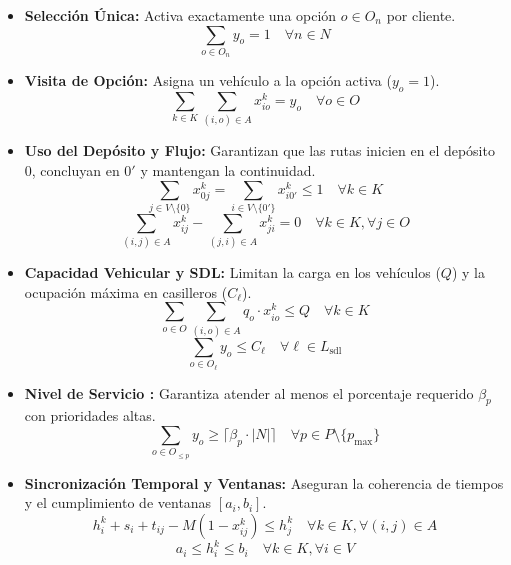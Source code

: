 \documentclass[letter, 10pt]{article}
\begin{document}
\begin{itemize} 
    \item \textbf{Selección Única:} Activa exactamente una opción $o \in O_n$ por cliente.
    \begin{equation} 
        \sum_{o \in O_n} y_o = 1 \quad \forall n \in N \label{eq:seleccion_unica} 
    \end{equation} 
    \item \textbf{Visita de Opción:} Asigna un vehículo a la opción activa ($y_o=1$). 
    \begin{equation} 
        \sum_{k \in K} \sum_{(i, o) \in A} x_{io}^k = y_o \quad \forall o \in O \label{eq:asociacion_opcion_ruta} 
    \end{equation} 
    \item \textbf{Uso del Depósito y Flujo:} Garantizan que las rutas inicien en el depósito $0$, concluyan en $0'$ y mantengan la continuidad. 
    \begin{equation} 
        \sum_{j \in V \setminus \{0\}} x_{0j}^k = \sum_{i \in V \setminus \{0'\}} x_{i0'}^k \le 1 \quad \forall k \in K \label{eq:deposito} 
    \end{equation} 
    \begin{equation} 
        \sum_{(i, j) \in A} x_{ij}^k - \sum_{(j, i) \in A} x_{ji}^k = 0 \quad \forall k \in K, \forall j \in O \label{eq:conservacion_flujo} 
    \end{equation} 
    
    \item \textbf{Capacidad Vehicular y SDL:} Limitan la carga en los vehículos ($Q$) y la ocupación máxima en casilleros ($C_\ell$). 
    \begin{equation} 
        \sum_{o \in O} \sum_{(i, o) \in A} q_o \cdot x_{io}^k \le Q \quad \forall k \in K \label{eq:capacidad_vehiculo} 
    \end{equation}
    \begin{equation} 
        \sum_{o \in O_\ell} y_o \le C_\ell \quad \forall \ell \in L_{\text{sdl}} \label{eq:capacidad_sdl} 
    \end{equation} 
    
    \item \textbf{Nivel de Servicio :} Garantiza atender al menos el porcentaje requerido $\beta_p$ con prioridades altas. 
    \begin{equation} 
        \sum_{o \in O_{\le p}} y_o \ge \lceil \beta_p \cdot |N| \rceil \quad \forall p \in P \setminus \{p_{\max}\} \label{eq:nivel_servicio} 
    \end{equation}
    \item \textbf{Sincronización Temporal y Ventanas:} Aseguran la coherencia de tiempos y el cumplimiento de ventanas $[a_i, b_i]$. 
    \begin{equation} 
        h_i^k + s_i + t_{ij} - M(1 - x_{ij}^k) \le h_j^k \quad \forall k \in K, \forall (i, j) \in A \label{eq:sincronizacion_tiempo} 
    \end{equation} 
    \begin{equation} 
    a_i \le h_i^k \le b_i \quad \forall k \in K, \forall i \in V \label{eq:ventanas_tiempo} 
    \end{equation} 
\end{itemize}
\end{document}
